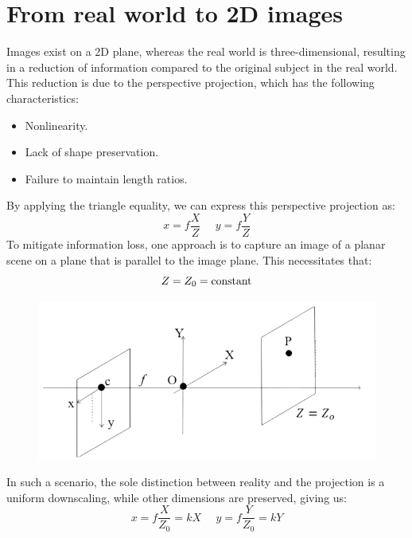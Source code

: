 \section{From real world to 2D images}

Images exist on a 2D plane, whereas the real world is three-dimensional, resulting in a reduction of information compared to the original subject in the real world. 
This reduction is due to the perspective projection, which has the following characteristics:
\begin{itemize}
    \item Nonlinearity.
    \item Lack of shape preservation.
    \item Failure to maintain length ratios.
\end{itemize}
By applying the triangle equality, we can express this perspective projection as:
\[x=f \dfrac{X}{Z} \:\:\:\:\:\: y=f \dfrac{Y}{Z}\]
To mitigate information loss, one approach is to capture an image of a planar scene on a plane that is parallel to the image plane. 
This necessitates that:
\[Z=Z_0=\textnormal{constant}\]
\begin{figure}[H]
    \centering
    \includegraphics[width=0.5\linewidth]{images/Z0.png}
\end{figure}
In such a scenario, the sole distinction between reality and the projection is a uniform downscaling, while other dimensions are preserved, giving us:
\[x=f \dfrac{X}{Z_0}=kX \:\:\:\:\:\: y=f \dfrac{Y}{Z_0}=kY \]